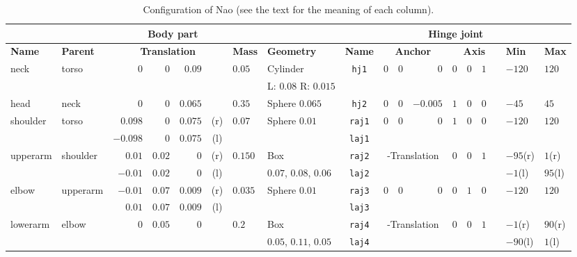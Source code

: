 \begin{landscape}
\begin{table}
  \centering
  \caption{Configuration of Nao (see the text for the meaning of each
    column).}
  \label{tab:nao-conf}
  \newcommand{\threegrid}[1]{\multicolumn{3}{c|}{#1}}
  \newcommand{\fourgrid}[1]{\multicolumn{4}{c|}{#1}}
  \begin{tabular}{|l|l|r@{,}r@{,}r@{}c|l|l|c|r@{,}r@{,}r|r@{,}r@{,}l@{}c|l|l|}
    \hline
    \multicolumn{8}{|c|}{\bf Body part} & \multicolumn{10}{c|}{\bf Hinge joint}\\
    \hline
    {\bf Name} & {\bf Parent} & \fourgrid{\bf Translation} & {\bf Mass} & {\bf Geometry} & {\bf Name} & \threegrid{\bf Anchor} & \fourgrid{\bf Axis} & {\bf Min} & {\bf Max}\\
    \hline\hline
    neck & torso & $0$&$0$&$0.09$& & $0.05$ & Cylinder & \texttt{hj1} & $0$&$0$&$0$ & $0$&$0$&$1$& & $-120$ & $120$\\
    & & \fourgrid{} & & L: $0.08$ R: $0.015$ & & \threegrid{} & \fourgrid{} & &\\
    \hline
    head & neck & $0$&$0$&$0.065$& & $0.35$ & Sphere $0.065$ & \texttt{hj2} & $0$&$0$&$-0.005$ & $1$&$0$&$0$& & $-45$ & $45$\\
    \hline
    shoulder & torso & $0.098$&$0$&$0.075$&(r)  & $0.07$ & Sphere $0.01$& \texttt{raj1} & $0$&$0$&$0$ & $1$&$0$&$0$& & $-120$ & $120$\\
    & & $-0.098$&$0$&$0.075$&(l) & & & \texttt{laj1} & \threegrid{} & \fourgrid{} & & \\
    \hline
    upperarm & shoulder & $0.01$&$0.02$&$0$&(r) & $0.150$ & Box & \texttt{raj2} & \threegrid{-Translation} & $0$&$0$&$1$& & $-95$(r) & $1$(r)  \\
    & & $-0.01$&$0.02$&$0$&(l) & & $0.07$, $0.08$, $0.06$ & \texttt{laj2} & \threegrid{} & \fourgrid{} & $-1$(l) & $95$(l) \\
    \hline
    elbow & upperarm & $-0.01$&$0.07$&$0.009$&(r) & $0.035$ & Sphere $0.01$ & \texttt{raj3} & $0$&$0$&$0$ & $0$&$1$&$0$& & $-120$ & $120$ \\
    & & $0.01$&$0.07$&$0.009$&(l) & & & \texttt{laj3} & \threegrid{} & \fourgrid{} & &\\
    \hline
    lowerarm & elbow & $0$&$0.05$&$0$& & $0.2$ & Box & \texttt{raj4} & \threegrid{-Translation} & $0$&$0$&$1$& & $-1$(r) & $90$(r) \\
    & & \fourgrid{} & & $0.05$, $0.11$, $0.05$ & \texttt{laj4} & \threegrid{} & \fourgrid{} & $-90$(l) & $1$(l) \\

\end{tabular}
\end{table}
\end{landscape}

